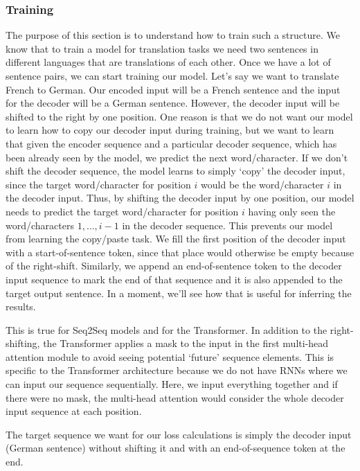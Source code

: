 \subsubsection{Training}
The purpose of this section is to understand how to train such a structure. We know that to train a model for translation tasks we need two sentences in different languages that are translations of each other. Once we have a lot of sentence pairs, we can start training our model. Let's say we want to translate French to German. Our encoded input will be a French sentence and the input for the decoder will be a German sentence. However, the decoder input will be shifted to the right by one position. One reason is that we do not want our model to learn how to copy our decoder input during training, but we want to learn that given the encoder sequence and a particular decoder sequence, which has been already seen by the model, we predict the next word/character. If we don’t shift the decoder sequence, the model learns to simply ‘copy’ the decoder input, since the target word/character for position $i$ would be the word/character $i$ in the decoder input. Thus, by shifting the decoder input by one position, our model needs to predict the target word/character for position $i$ having only seen the word/characters $1, \hdots, i-1$ in the decoder sequence. This prevents our model from learning the copy/paste task. We fill the first position of the decoder input with a start-of-sentence token, since that place would otherwise be empty because of the right-shift. Similarly, we append an end-of-sentence token to the decoder input sequence to mark the end of that sequence and it is also appended to the target output sentence. In a moment, we’ll see how that is useful for inferring the results. \newline

This is true for Seq2Seq models and for the Transformer. In addition to the right-shifting, the Transformer applies a mask to the input in the first multi-head attention module to avoid seeing potential ‘future’ sequence elements. This is specific to the Transformer architecture because we do not have RNNs where we can input our sequence sequentially. Here, we input everything together and if there were no mask, the multi-head attention would consider the whole decoder input sequence at each position. \newline

The target sequence we want for our loss calculations is simply the decoder input (German sentence) without shifting it and with an end-of-sequence token at the end.

